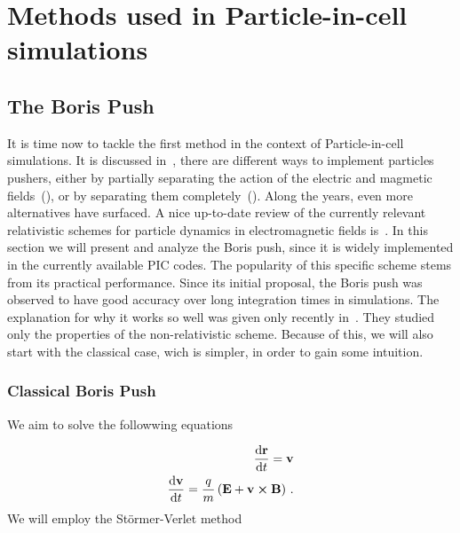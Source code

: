 \documentclass[12pt, class=report, crop=false]{standalone}
\begin{document}
\section{Methods used in Particle-in-cell simulations}
\subsection{The Boris Push}

It is time now to tackle the first method in the context of Particle-in-cell simulations. It is discussed in~\cite{birdsallPlasmaPhysicsComputer1995}, there are different ways to implement particles pushers, either by partially separating the action of the electric and magmetic fields~(\cite{bunemanTimereversibleDifferenceProcedures1967}), or by separating them completely~(\cite{borisRelativisticPlasmaSimulation1970}). Along the years, even more alternatives have surfaced. A nice up-to-date review of the currently relevant relativistic schemes for particle dynamics in electromagnetic fields is~\cite{ripperdaComprehensiveComparisonRelativistic2018}. In this section we will present and analyze the Boris push, since it is widely implemented in the currently available PIC codes. The popularity of this specific scheme stems from its practical performance. Since its initial proposal, the Boris push was observed to have good accuracy over long integration times in simulations. The explanation for why it works so well was given only recently in~\cite{qinWhyBorisAlgorithm2013}. They studied only the properties of the non-relativistic scheme. Because of this, we will also start with the classical case, wich is simpler, in order to gain some intuition.

\subsubsection{Classical Boris Push}

We aim to solve the followwing equations

\begin{subequations}
  \begin{align}
    \dv{\vb{r}}{t} = \vb{v}\\
    \dv{\vb{v}}{t} = \frac{q}{m} \left(\vb{E} + \vb{v}\cp \vb{B}\right)\,.
  \end{align}
\end{subequations}
We will employ the Störmer-Verlet method
\end{document}
